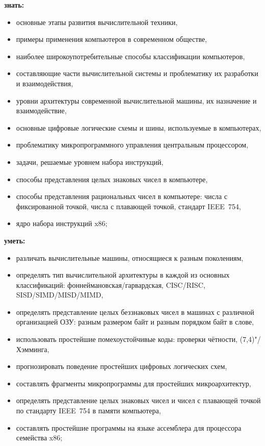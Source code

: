 \noindent\textbf{знать:}
	\begin{itemize}[topsep=1mm]
		\item основные этапы развития вычислительной техники,
		\item примеры применения компьютеров в современном обществе,
		\item наиболее широкоупотребительные способы классификации компьютеров,
		\item составляющие части вычислительной системы и проблематику их разработки и взаимодействия,
		\item уровни архитектуры современной вычислительной машины, их назначение и взаимодействие,
		\item основные цифровые логические схемы и шины, используемые в компьютерах,
		\item проблематику микропрограммного управления центральным процессором,
		\item задачи, решаемые уровнем набора инструкций,
		\item способы представления целых знаковых чисел в компьютере,
		\item способы представления рациональных чисел в компьютере: числа с фиксированной точкой, числа с плавающей точкой, стандарт IEEE~754,
		\item ядро набора инструкций x86;
	\end{itemize}

\noindent\textbf{уметь:}
	\begin{itemize}[topsep=1mm]
		\item различать вычислительные машины, относящиеся к разным поколениям,
		\item определять тип вычислительной архитектуры в каждой из основных классификаций: фоннеймановская/гарвардская, CISC/RISC, SISD/SIMD/MISD/MIMD,
		\item определять представление целых беззнаковых чисел в машинах с различной организацией ОЗУ: разным размером байт и разным порядком байт в слове,
		\item использовать простейшие помехоустойчивые коды: проверки чётности, (7,4)"/Хэм\-мин\-га,
		\item прогнозировать поведение простейших цифровых логических схем,
		\item составлять фрагменты микропрограммы для простейших микроархитектур,
		\item определять представление целых знаковых чисел и чисел с плавающей точкой по стандарту IEEE~754 в памяти компьютера,
		\item составлять простейшие программы на языке ассемблера для процессора семейства x86;
	\end{itemize}

